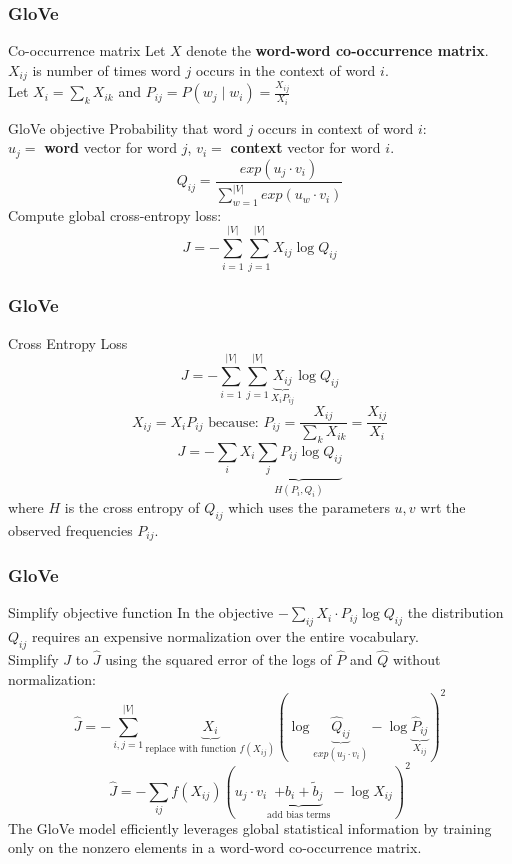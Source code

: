\begin{frame}
\frametitle{GloVe}
\begin{alertblock}{Co-occurrence matrix}
Let $X$ denote the \textbf{word-word co-occurrence matrix}.\\
$X_{ij}$ is number of times word $j$ occurs in the context of word $i$.\\
Let $X_i = \sum_k X_{ik}$ and $P_{ij} = P(w_j \mid w_i) = \frac{X_{ij}}{X_i}$
\end{alertblock}
\pause
\begin{alertblock}{GloVe objective}
Probability that word $j$ occurs in context of word $i$: \\
$u_j=$ \textbf{word} vector for word $j$, $v_i=$ \textbf{context} vector for word $i$.\\
\[ Q_{ij} = \frac{exp(u_j \cdot v_i)}{\sum_{w=1}^{|V|} exp(u_w \cdot v_i) } \]
\pause
Compute global cross-entropy loss:
\[ J = - \sum_{i=1}^{|V|} \sum_{j=1}^{|V|} X_{ij} \log Q_{ij} \]
\end{alertblock}
\end{frame}

\begin{frame}
\frametitle{GloVe}
\begin{alertblock}{Cross Entropy Loss}
\[ J = - \sum_{i=1}^{|V|} \sum_{j=1}^{|V|} \underbrace{X_{ij}}_{X_i P_{ij}} \log Q_{ij} \]
 \[ \textrm{$X_{ij} = X_i P_{ij}$ because: } P_{ij} = \frac{X_{ij}}{\sum_{k} X_{ik}} = \frac{X_{ij}}{X_i} \]
\pause
\[ J = - \sum_i X_i \underbrace{\sum_j P_{ij} \log Q_{ij}}_{H(P_i, Q_i)} \]
where $H$ is the cross entropy of $Q_{ij}$ which uses the parameters $u, v$ wrt the observed frequencies $P_{ij}$.
\end{alertblock}
\end{frame}


\begin{frame}
\frametitle{GloVe}
\begin{alertblock}{Simplify objective function}
 In the objective $- \sum_{ij} X_i \cdot P_{ij} \log Q_{ij}$ the distribution $Q_{ij}$ requires an expensive normalization over the entire vocabulary.\\
\pause
Simplify $J$ to $\hat{J}$ using the squared error of the logs of $\hat{P}$ and $\hat{Q}$ without normalization:
\[ \hat{J} = - \sum_{i,j=1}^{|V|} \underbrace{X_i}_{\textrm{replace with function $f(X_{ij})$}} \left( \log \underbrace{\hat{Q}_{ij}}_{exp(u_j \cdot v_i)} - \log \underbrace{\hat{P}_{ij}}_{X_{ij}} \right)^2 \]
\pause
\[ \hat{J} = - \sum_{ij} f(X_{ij})  ( u_j \cdot v_i \underbrace{+ b_i + \tilde{b}_j}_{\text{add bias terms}} - \log X_{ij} )^2 \] 
\pause
The GloVe model efficiently leverages global statistical information by training only on the nonzero elements in a word-word co-occurrence matrix.
\end{alertblock}
\end{frame}


